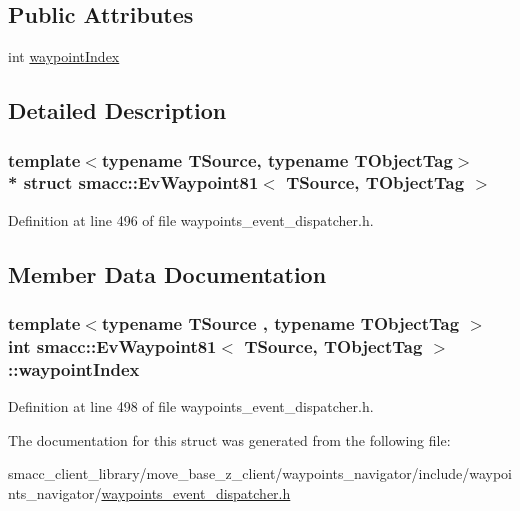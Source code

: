 \subsection*{Public Attributes}
\begin{DoxyCompactItemize}
\item 
int \hyperlink{structsmacc_1_1EvWaypoint81_a3f5684a5cf709ccb46f2c5c09157c1f0}{waypoint\+Index}
\end{DoxyCompactItemize}


\subsection{Detailed Description}
\subsubsection*{template$<$typename T\+Source, typename T\+Object\+Tag$>$\\*
struct smacc\+::\+Ev\+Waypoint81$<$ T\+Source, T\+Object\+Tag $>$}



Definition at line 496 of file waypoints\+\_\+event\+\_\+dispatcher.\+h.



\subsection{Member Data Documentation}
\subsubsection[{\texorpdfstring{waypoint\+Index}{waypointIndex}}]{\setlength{\rightskip}{0pt plus 5cm}template$<$typename T\+Source , typename T\+Object\+Tag $>$ int {\bf smacc\+::\+Ev\+Waypoint81}$<$ T\+Source, T\+Object\+Tag $>$\+::waypoint\+Index}\hypertarget{structsmacc_1_1EvWaypoint81_a3f5684a5cf709ccb46f2c5c09157c1f0}{}\label{structsmacc_1_1EvWaypoint81_a3f5684a5cf709ccb46f2c5c09157c1f0}


Definition at line 498 of file waypoints\+\_\+event\+\_\+dispatcher.\+h.



The documentation for this struct was generated from the following file\+:\begin{DoxyCompactItemize}
\item 
smacc\+\_\+client\+\_\+library/move\+\_\+base\+\_\+z\+\_\+client/waypoints\+\_\+navigator/include/waypoints\+\_\+navigator/\hyperlink{waypoints__event__dispatcher_8h}{waypoints\+\_\+event\+\_\+dispatcher.\+h}\end{DoxyCompactItemize}
